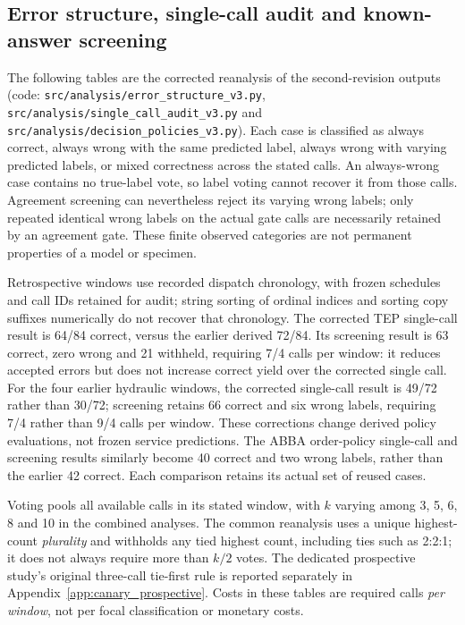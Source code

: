 \documentclass[11pt,a4paper]{article}
\begin{document}


\FloatBarrier
\subsection*{Error structure, single-call audit and known-answer screening}
The following tables are the corrected reanalysis of the second-revision outputs (code: \nolinkurl{src/analysis/error_structure_v3.py}, \nolinkurl{src/analysis/single_call_audit_v3.py} and \nolinkurl{src/analysis/decision_policies_v3.py}). Each case is classified as always correct, always wrong with the same predicted label, always wrong with varying predicted labels, or mixed correctness across the stated calls. An always-wrong case contains no true-label vote, so label voting cannot recover it from those calls. Agreement screening can nevertheless reject its varying wrong labels; only repeated identical wrong labels on the actual gate calls are necessarily retained by an agreement gate. These finite observed categories are not permanent properties of a model or specimen.

Retrospective windows use recorded dispatch chronology, with frozen schedules and call IDs retained for audit; string sorting of ordinal indices and sorting copy suffixes numerically do not recover that chronology. The corrected TEP single-call result is 64/84 correct, versus the earlier derived 72/84. Its screening result is 63 correct, zero wrong and 21 withheld, requiring 7/4 calls per window: it reduces accepted errors but does not increase correct yield over the corrected single call. For the four earlier hydraulic windows, the corrected single-call result is 49/72 rather than 30/72; screening retains 66 correct and six wrong labels, requiring 7/4 rather than 9/4 calls per window. These corrections change derived policy evaluations, not frozen service predictions. The ABBA order-policy single-call and screening results similarly become 40 correct and two wrong labels, rather than the earlier 42 correct. Each comparison retains its actual set of reused cases.

Voting pools all available calls in its stated window, with $k$ varying among 3, 5, 6, 8 and 10 in the combined analyses. The common reanalysis uses a unique highest-count \emph{plurality} and withholds any tied highest count, including ties such as 2:2:1; it does not always require more than $k/2$ votes. The dedicated prospective study's original three-call tie-first rule is reported separately in Appendix~\ref{app:canary_prospective}. Costs in these tables are required calls \emph{per window}, not per focal classification or monetary costs.
\end{document}
